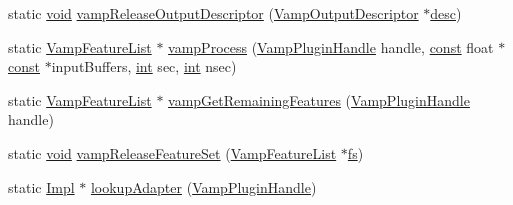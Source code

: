 \begin{DoxyCompactItemize}
\item 
static \hyperlink{sound_8c_ae35f5844602719cf66324f4de2a658b3}{void} \hyperlink{class_vamp_1_1_plugin_adapter_base_1_1_impl_aff063ab7b4dfb0d13883e7ce19cf93a3}{vamp\+Release\+Output\+Descriptor} (\hyperlink{vamp_8h_aa8429dd9c60d65800c58574c2b06bf66}{Vamp\+Output\+Descriptor} $\ast$\hyperlink{_export_p_c_m_8cpp_a717c8108dd6ce1ecc369d9bac2f471f2}{desc})
\item 
static \hyperlink{vamp_8h_a5f257e3f8b5ca1ca4c159d486e219078}{Vamp\+Feature\+List} $\ast$ \hyperlink{class_vamp_1_1_plugin_adapter_base_1_1_impl_abc8f37b80648a0a7108a6e0ebaf45525}{vamp\+Process} (\hyperlink{vamp_8h_ad3be2952b1f4ad7d775940a6db75c79b}{Vamp\+Plugin\+Handle} handle, \hyperlink{getopt1_8c_a2c212835823e3c54a8ab6d95c652660e}{const} float $\ast$\hyperlink{getopt1_8c_a2c212835823e3c54a8ab6d95c652660e}{const} $\ast$input\+Buffers, \hyperlink{xmltok_8h_a5a0d4a5641ce434f1d23533f2b2e6653}{int} sec, \hyperlink{xmltok_8h_a5a0d4a5641ce434f1d23533f2b2e6653}{int} nsec)
\item 
static \hyperlink{vamp_8h_a5f257e3f8b5ca1ca4c159d486e219078}{Vamp\+Feature\+List} $\ast$ \hyperlink{class_vamp_1_1_plugin_adapter_base_1_1_impl_af6af04fcb927463cfe1f85e936935767}{vamp\+Get\+Remaining\+Features} (\hyperlink{vamp_8h_ad3be2952b1f4ad7d775940a6db75c79b}{Vamp\+Plugin\+Handle} handle)
\item 
static \hyperlink{sound_8c_ae35f5844602719cf66324f4de2a658b3}{void} \hyperlink{class_vamp_1_1_plugin_adapter_base_1_1_impl_ab0bc48dbdb1396410690d1b190522a95}{vamp\+Release\+Feature\+Set} (\hyperlink{vamp_8h_a5f257e3f8b5ca1ca4c159d486e219078}{Vamp\+Feature\+List} $\ast$\hyperlink{sndfile__load_8m_a6f04aa8324068801354b01b63f16f331}{fs})
\item 
static \hyperlink{class_vamp_1_1_plugin_adapter_base_1_1_impl}{Impl} $\ast$ \hyperlink{class_vamp_1_1_plugin_adapter_base_1_1_impl_a186446e143fb2bb237c952a14db6ceff}{lookup\+Adapter} (\hyperlink{vamp_8h_ad3be2952b1f4ad7d775940a6db75c79b}{Vamp\+Plugin\+Handle})
\end{DoxyCompactItemize}

